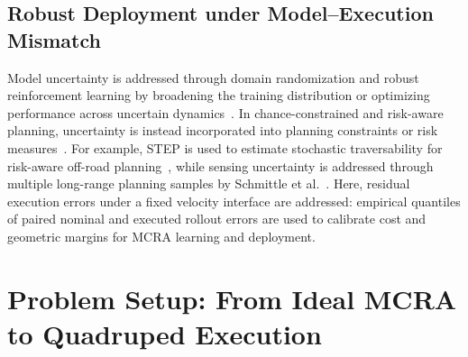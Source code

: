 \documentclass[conference]{IEEEtran}
\begin{document}
\subsection{Robust Deployment under Model--Execution Mismatch}
Model uncertainty is addressed through domain randomization and robust
reinforcement learning by broadening the training distribution or optimizing
performance across uncertain dynamics~\cite{tobin2017,smirnova2019,wang2021,liu2022drql}.
In chance-constrained and risk-aware planning, uncertainty is instead incorporated
into planning constraints or risk measures~\cite{theurkauf2023,fan2021step,schmittle2024}. For example, STEP
is used to estimate stochastic traversability for risk-aware off-road
planning~\cite{fan2021step}, while sensing uncertainty is addressed through
multiple long-range planning samples by Schmittle et al.~\cite{schmittle2024}.
Here, residual execution errors under a fixed velocity interface are addressed:
empirical quantiles of paired nominal and executed rollout errors are
used to calibrate cost and geometric margins for MCRA learning and deployment.

\section{Problem Setup: From Ideal MCRA to Quadruped Execution}
\label{sec:problem_setup}
\end{document}
